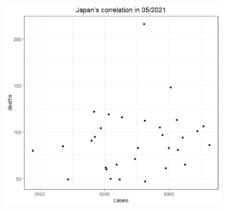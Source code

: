 \documentclass[english,10pt,table]{beamer}
\begin{document}
{\begin{figure}[H]
\begin{center}
        \includegraphics[scale = 0.2]{ix/ix.2/JPN_05_2021.png}
    \end{center}
    \end{figure}
}
\end{document}
